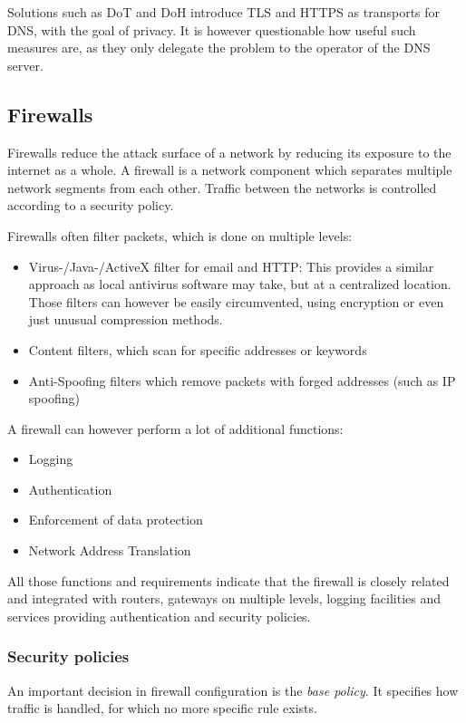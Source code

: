 Solutions such as DoT and DoH introduce TLS and HTTPS as transports for DNS,
with the goal of privacy. It is however questionable how useful such measures
are, as they only delegate the problem to the operator of the DNS server.

\subsection{Firewalls}
Firewalls reduce the attack surface of a network by reducing its exposure to the
internet as a whole. A firewall is a network component which separates multiple
network segments from each other. Traffic between the networks is controlled
according to a security policy.

Firewalls often filter packets, which is done on multiple levels:
\begin{itemize}
    \item Virus-/Java-/ActiveX filter for email and HTTP: This provides a
          similar approach as local antivirus software may take, but at a
          centralized location. Those filters can however be easily
          circumvented, using encryption or even just unusual compression
          methods.
    \item Content filters, which scan for specific addresses or keywords
    \item Anti-Spoofing filters which remove packets with forged addresses (such
          as IP spoofing)
\end{itemize}

A firewall can however perform a lot of additional functions:
\begin{itemize}
    \item Logging
    \item Authentication
    \item Enforcement of data protection
    \item Network Address Translation
\end{itemize}

All those functions and requirements indicate that the firewall is closely
related and integrated with routers, gateways on multiple levels, logging
facilities and services providing authentication and security policies.

\subsubsection{Security policies}
An important decision in firewall configuration is the \emph{base policy}. It
specifies how traffic is handled, for which no more specific rule exists.

